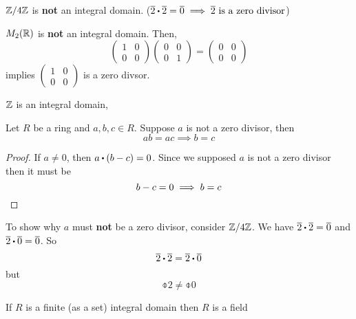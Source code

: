 \documentclass[../Main.tex]{subfiles}
\begin{document}
\begin{example}
	$\mathbb{Z}/4\mathbb{Z}$ is \textbf{not} an integral domain. ($\obar{2}\rdot \obar{2}=\obar{0}\implies \obar{2} \textrm{ is a zero divisor}$)
\end{example}
\begin{example}
	$M_2(\mathbb{R})$ is \textbf{not} an integral domain. Then,
	\[\begin{pmatrix}
	1&0\\0&0
	\end{pmatrix}\begin{pmatrix}
	0&0\\0&1
	\end{pmatrix}=\begin{pmatrix}
	0&0\\0&0
	\end{pmatrix}\]
	implies $\begin{pmatrix}
	1&0\\0&0
	\end{pmatrix}$ is a zero divsor.
\end{example}
\begin{example}
	$\mathbb{Z}$ is an integral domain,
\end{example}
\begin{prop}[title=Cancellation Law]
	Let $R$ be a ring and $a,b,c\in R$.\newline
	Suppose $a$ is not a zero divisor, then
		\[ab=ac\implies b=c\]
\end{prop}
\begin{proof}
	If $a\ne0$, then $a\rdot (b-c)=0$. Since we supposed $a$ is not a zero divisor then it must be
	\[b-c=0 \implies b=c\qedhere\]
\end{proof}
\begin{example}
	To show why $a$ must \textbf{not} be a zero divisor, consider $\mathbb{Z}/4\mathbb{Z}$. We have $\obar{2}\rdot \obar{2}=\obar{0}$ and $\obar{2}\rdot \obar{0}=\obar{0}$. So
	\[\obar{2}\rdot \obar{2}=\obar{2}\rdot \obar{0}\]
	but
	\[\obar{2}\ne \obar{0}\]
\end{example}
\begin{crl}[title = Finite integral domain is field]
	If $R$ is a finite (as a set) integral domain then $R$ is a field
\end{crl}
\end{document}
